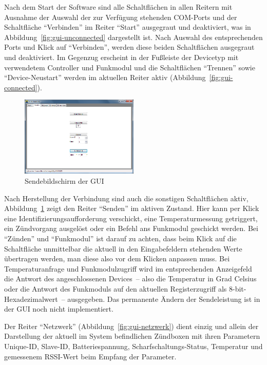 \documentclass[paper=a4, parskip, numbers=noenddot, toc=listof, headsepline]{scrbook}
\begin{document}
			Nach dem Start der Software sind alle Schaltflächen in allen Reitern mit Ausnahme der Auswahl der zur Verfügung stehenden COM-Ports und der Schaltfläche \enquote{Verbinden} im Reiter \enquote{Start} ausgegraut und deaktiviert, was in Abbildung~\ref{fig:gui-unconnected} dargestellt ist. Nach Auswahl des entsprechenden Ports und Klick auf \enquote{Verbinden}, werden diese beiden Schaltflächen ausgegraut und deaktiviert. Im Gegenzug erscheint in der Fußleiste der Devicetyp mit verwendetem Controller und Funkmodul und die Schaltflächen \enquote{Trennen} sowie \enquote{Device-Neustart} werden im aktuellen Reiter aktiv (Abbildung~\ref{fig:gui-connected}).%
			\begin{figure}[!b]
				\centering
				\includegraphics[width=0.5\textwidth]{bilder/gui-senden}
				\caption{Sendebildschirm der GUI}
				\label{fig:gui-senden}
			\end{figure}

			Nach Herstellung der Verbindung sind auch die sonstigen Schaltflächen aktiv, Abbildung~\ref{fig:gui-senden} zeigt den Reiter \enquote{Senden} im aktiven Zustand. Hier kann per Klick eine Identifizierungsaufforderung verschickt, eine Temperaturmessung getriggert, ein Zündvorgang ausgelöst oder ein Befehl ans Funkmodul geschickt werden. Bei \enquote{Zünden} und \enquote{Funkmodul} ist darauf zu achten, dass beim Klick auf die Schaltfläche unmittelbar die aktuell in den Eingabefeldern stehenden Werte übertragen werden, man diese also vor dem Klicken anpassen muss. Bei Temperaturanfrage und Funkmodulzugriff wird im entsprechenden Anzeigefeld die Antwort des angeschlossenen Devices~-- also die Temperatur in Grad Celsius oder die Antwort des Funkmoduls auf den aktuellen Registerzugriff als 8-bit-Hexadezimalwert~-- ausgegeben. Das permanente Ändern der Sendeleistung ist in der GUI noch nicht implementiert.

			Der Reiter \enquote{Netzwerk} (Abbildung~\ref{fig:gui-netzwerk}) dient einzig und allein der Darstellung der aktuell im System befindlichen Zündboxen mit ihren Parametern Unique-ID, Slave-ID, Batteriespannung, Scharf\-schaltungs-Status, Temperatur und gemessenem RSSI-Wert beim Empfang der Parameter.
\end{document}
